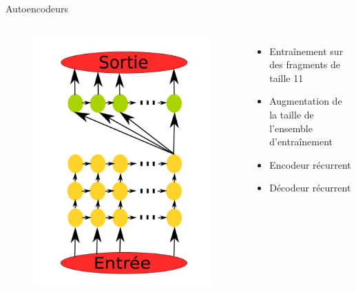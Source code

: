 \documentclass{beamer}
\begin{document}
\begin{frame}{Autoencodeurs}

  \begin{columns}
    \begin{figure}
      \centering
      \includegraphics[scale=0.17]{../Figures/EncoDeco}
    \end{figure}

    \begin{itemize}
    \item Entraînement sur des fragments de taille 11\pause
    \item Augmentation de la taille de l'ensemble d'entraînement\pause
    \item Encodeur \alert{récurrent}\pause
    \item Décodeur récurrent
    \end{itemize}
  \end{columns}
  
\end{frame}
\end{document}
